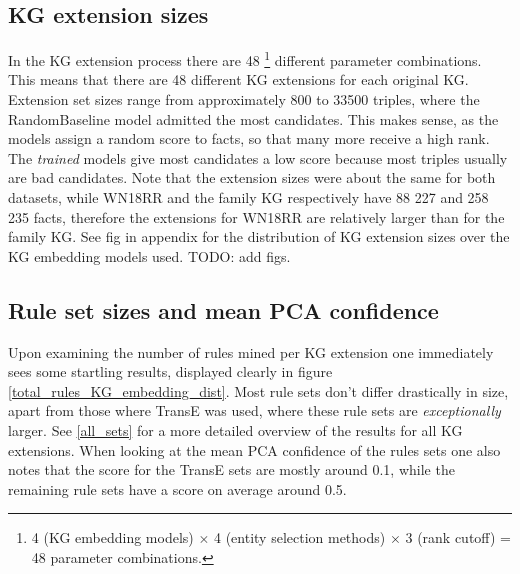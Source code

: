 \subsection{KG extension sizes}
In the KG extension process there are 48 \footnote{4 (KG embedding models) $\times$ 4 (entity selection methods) $\times$ 3 (rank cutoff) = 48 parameter combinations.} different parameter combinations. This means that there are 48 different KG extensions for each original KG. Extension set sizes range from approximately 800 to 33500 triples, where the RandomBaseline model admitted the most candidates. This makes sense, as the models assign a random score to facts, so that many more receive a high rank. The \textit{trained} models give most candidates a low score because most triples usually are bad candidates. Note that the extension sizes were about the same for both datasets, while WN18RR and the family KG respectively have 88 227 and 258 235 facts, therefore the extensions for WN18RR are relatively larger than for the family KG. See fig in appendix for the distribution of KG extension sizes over the KG embedding models used. TODO: add figs.

\subsection{Rule set sizes and mean PCA confidence}
\label{TransE_sucks} 
Upon examining the number of rules mined per KG extension one immediately sees some startling results, displayed clearly in figure \ref{total_rules_KG_embedding_dist}. Most rule sets don't differ drastically in size, apart from those where TransE was used, where these rule sets are \textit{exceptionally} larger. See \cref{all_sets} for a more detailed overview of the results for all KG extensions. When looking at the mean PCA confidence of the rules sets one also notes that the score for the TransE sets are mostly around 0.1, while the remaining rule sets have a score on average around 0.5.

